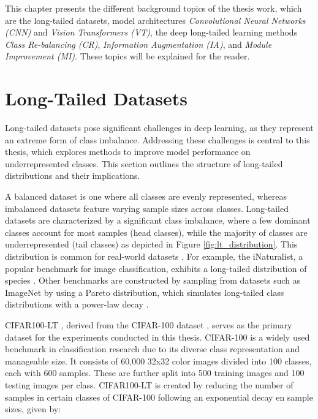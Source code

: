 

This chapter presents the different background topics of the thesis work, which are the long-tailed datasets, model architectures \textit{Convolutional Neural Networks (CNN)} and \textit{Vision Transformers (VT)}, the deep long-tailed learning methods \textit{Class Re-balancing (CR)}, \textit{Information Augmentation (IA)}, 
and \textit{Module Improvement (MI)}. These topics will be explained for the reader.



\section{Long-Tailed Datasets}
\label{sec:lt-datasets}
Long-tailed datasets pose significant challenges in deep learning, as they represent an extreme form of class imbalance. Addressing these challenges is central to this thesis, which explores methods to improve model performance on underrepresented classes. This section outlines the structure of long-tailed distributions and their implications.

A balanced dataset is one where all classes are evenly represented, whereas imbalanced datasets feature varying sample sizes across classes. Long-tailed datasets are characterized by a significant class imbalance, where a few dominant classes account for most samples (head classes), while the majority of classes are underrepresented (tail classes) as depicted in Figure \ref{fig:lt_distribution}. This  distribution is common for real-world datasets \cite{Newman_2005, liu2019largescalelongtailedrecognitionopen}. For example, the iNaturalist, a popular benchmark for image classification, exhibits a long-tailed distribution of species \cite{vanhorn2018inaturalistspeciesclassificationdetection}. Other benchmarks are constructed by sampling from datasets such as ImageNet \cite{ImageNet2009} by using a Pareto distribution, which simulates long-tailed class distributions with a power-law decay \cite{zhang2023deep, dealvis2024surveydeeplongtailclassification,cao2019learningimbalanceddatasetslabeldistributionaware}.

CIFAR100-LT \cite{cao2019learningimbalanceddatasetslabeldistributionaware}, derived from the CIFAR-100 dataset \cite{krizhevsky2009learning}, serves as the primary dataset for the experiments conducted in this thesis. CIFAR-100 is a widely used benchmark in classification research due to its diverse class representation and manageable size. It consists of 60,000 32x32 color images divided into 100 classes, each with 600 samples. These are further split into 500 training images and 100 testing images per class. CIFAR100-LT is created by reducing the number of samples in certain classes of CIFAR-100 following an exponential decay en sample sizes, given by:

